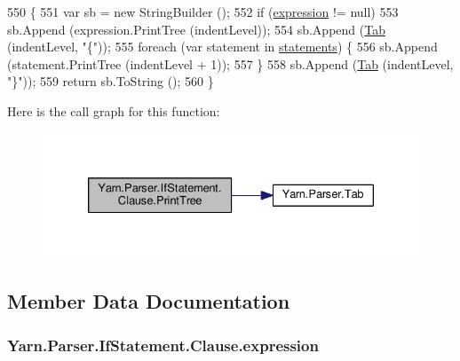 \begin{DoxyCode}
550                                                            \{
551                     var sb = \textcolor{keyword}{new} StringBuilder ();
552                     \textcolor{keywordflow}{if} (\hyperlink{a00052_a1abd1f7c41f68ccdf64074ea49365be9}{expression} != null)
553                         sb.Append (expression.PrintTree (indentLevel));
554                     sb.Append (\hyperlink{a00151_aa8fa36b46de12a1c561d77b99c4b9ae3}{Tab} (indentLevel, \textcolor{stringliteral}{"\{"}));
555                     \textcolor{keywordflow}{foreach} (var statement \textcolor{keywordflow}{in} \hyperlink{a00052_a6f4765482e98ed042e38a0ede13f171f}{statements}) \{
556                         sb.Append (statement.PrintTree (indentLevel + 1));
557                     \}
558                     sb.Append (\hyperlink{a00151_aa8fa36b46de12a1c561d77b99c4b9ae3}{Tab} (indentLevel, \textcolor{stringliteral}{"\}"}));
559                     \textcolor{keywordflow}{return} sb.ToString ();
560                 \}
\end{DoxyCode}


Here is the call graph for this function\-:
\nopagebreak
\begin{figure}[H]
\begin{center}
\leavevmode
\includegraphics[width=330pt]{a00052_a7f4fc9399896512b68fdc7bc7cf818c9_cgraph}
\end{center}
\end{figure}




\subsection{Member Data Documentation}
\hypertarget{a00052_a1abd1f7c41f68ccdf64074ea49365be9}{
\subsubsection[{expression}]{ Yarn.\-Parser.\-If\-Statement.\-Clause.\-expression\hspace{0.3cm}{\ttfamily [package]}}}\label{a00052_a1abd1f7c41f68ccdf64074ea49365be9}


